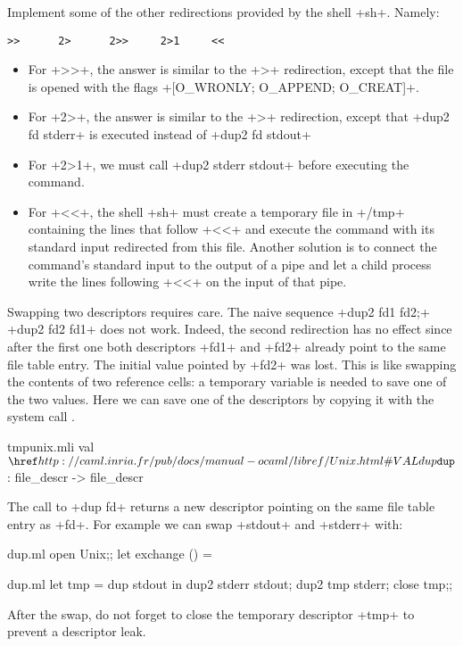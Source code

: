 \begin{exercise}
Implement some of the other redirections provided by the shell
\ml+sh+. Namely: 
%
\begin{lstlisting}
>>      2>      2>>     2>1     <<
\end{lstlisting}
%
\end{exercise}
\begin{answer}
\begin{itemize}
\item For \ml+>>+, the answer is similar to the \ml+>+ redirection, except that the
file  is opened with the flags \ml+[O_WRONLY; O_APPEND; O_CREAT]+.
%
\item For \ml+2>+, the answer is similar to the \ml+>+ redirection, except that
\ml+dup2 fd stderr+ is executed instead of \ml+dup2 fd stdout+
%
\item For \ml+2>1+, we must call \ml+dup2 stderr stdout+ before executing
the command.
%
\item For \ml+<<+, the shell \ml+sh+ must create a temporary file in
\ml+/tmp+ containing the lines that follow \ml+<<+ and execute the 
command with its standard input redirected from this file. Another 
solution is to connect the command's standard input to the output of a 
pipe and let a child process write the lines following \ml+<<+ on the
input of that pipe.
\end{itemize}
\end{answer}

Swapping two descriptors requires care. The naive sequence
\ml+dup2 fd1 fd2;+ \ml+dup2 fd2 fd1+ does not work. Indeed, the second
redirection has no effect since after the first one both descriptors
\ml+fd1+ and \ml+fd2+ already point to the same file table entry.  The
initial value pointed by \ml+fd2+ was lost. This is like swapping the
contents of two reference cells: a temporary variable is needed to
save one of the two values. Here we can save one of the
descriptors by copying it with the system call .
%
\begin{listingcodefile}{tmpunix.mli}
val $\libvalue{Unix}{dup}$ : file_descr -> file_descr
\end{listingcodefile}
%
The call to \ml+dup fd+ returns a new descriptor pointing on the same
file table entry as \ml+fd+. For example we can swap \ml+stdout+ and 
\ml+stderr+ with:
%
\begin{codefile}{dup.ml}
open Unix;;
let exchange () = 
\end{codefile}
%
\begin{listingcodefile}{dup.ml}
let tmp = dup stdout in
dup2 stderr stdout; 
dup2 tmp stderr;
close tmp;;
\end{listingcodefile}
% 
After the swap, do not forget to close the temporary descriptor
\ml+tmp+ to prevent a descriptor leak.


